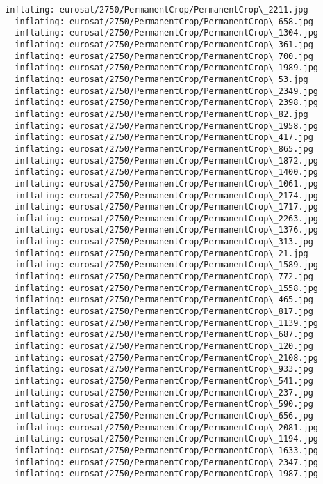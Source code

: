 \documentclass[11pt]{article}
\begin{document}
\begin{Verbatim}[commandchars=\\\{\}]
  inflating: eurosat/2750/PermanentCrop/PermanentCrop\_2211.jpg
  inflating: eurosat/2750/PermanentCrop/PermanentCrop\_658.jpg
  inflating: eurosat/2750/PermanentCrop/PermanentCrop\_1304.jpg
  inflating: eurosat/2750/PermanentCrop/PermanentCrop\_361.jpg
  inflating: eurosat/2750/PermanentCrop/PermanentCrop\_700.jpg
  inflating: eurosat/2750/PermanentCrop/PermanentCrop\_1989.jpg
  inflating: eurosat/2750/PermanentCrop/PermanentCrop\_53.jpg
  inflating: eurosat/2750/PermanentCrop/PermanentCrop\_2349.jpg
  inflating: eurosat/2750/PermanentCrop/PermanentCrop\_2398.jpg
  inflating: eurosat/2750/PermanentCrop/PermanentCrop\_82.jpg
  inflating: eurosat/2750/PermanentCrop/PermanentCrop\_1958.jpg
  inflating: eurosat/2750/PermanentCrop/PermanentCrop\_417.jpg
  inflating: eurosat/2750/PermanentCrop/PermanentCrop\_865.jpg
  inflating: eurosat/2750/PermanentCrop/PermanentCrop\_1872.jpg
  inflating: eurosat/2750/PermanentCrop/PermanentCrop\_1400.jpg
  inflating: eurosat/2750/PermanentCrop/PermanentCrop\_1061.jpg
  inflating: eurosat/2750/PermanentCrop/PermanentCrop\_2174.jpg
  inflating: eurosat/2750/PermanentCrop/PermanentCrop\_1717.jpg
  inflating: eurosat/2750/PermanentCrop/PermanentCrop\_2263.jpg
  inflating: eurosat/2750/PermanentCrop/PermanentCrop\_1376.jpg
  inflating: eurosat/2750/PermanentCrop/PermanentCrop\_313.jpg
  inflating: eurosat/2750/PermanentCrop/PermanentCrop\_21.jpg
  inflating: eurosat/2750/PermanentCrop/PermanentCrop\_1589.jpg
  inflating: eurosat/2750/PermanentCrop/PermanentCrop\_772.jpg
  inflating: eurosat/2750/PermanentCrop/PermanentCrop\_1558.jpg
  inflating: eurosat/2750/PermanentCrop/PermanentCrop\_465.jpg
  inflating: eurosat/2750/PermanentCrop/PermanentCrop\_817.jpg
  inflating: eurosat/2750/PermanentCrop/PermanentCrop\_1139.jpg
  inflating: eurosat/2750/PermanentCrop/PermanentCrop\_687.jpg
  inflating: eurosat/2750/PermanentCrop/PermanentCrop\_120.jpg
  inflating: eurosat/2750/PermanentCrop/PermanentCrop\_2108.jpg
  inflating: eurosat/2750/PermanentCrop/PermanentCrop\_933.jpg
  inflating: eurosat/2750/PermanentCrop/PermanentCrop\_541.jpg
  inflating: eurosat/2750/PermanentCrop/PermanentCrop\_237.jpg
  inflating: eurosat/2750/PermanentCrop/PermanentCrop\_590.jpg
  inflating: eurosat/2750/PermanentCrop/PermanentCrop\_656.jpg
  inflating: eurosat/2750/PermanentCrop/PermanentCrop\_2081.jpg
  inflating: eurosat/2750/PermanentCrop/PermanentCrop\_1194.jpg
  inflating: eurosat/2750/PermanentCrop/PermanentCrop\_1633.jpg
  inflating: eurosat/2750/PermanentCrop/PermanentCrop\_2347.jpg
  inflating: eurosat/2750/PermanentCrop/PermanentCrop\_1987.jpg

\end{Verbatim}
\end{document}
